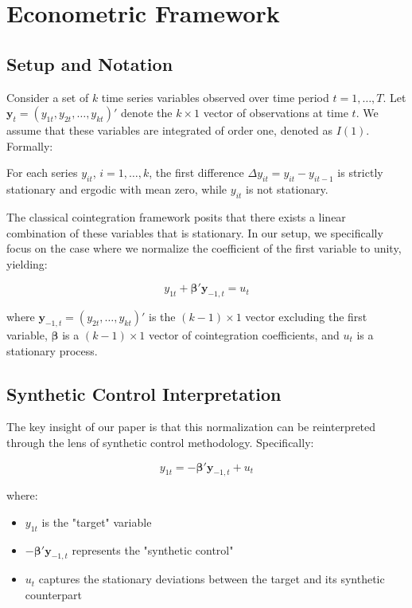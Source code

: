 \section{Econometric Framework}

\subsection{Setup and Notation}

Consider a set of $k$ time series variables observed over time period $t = 1,\ldots,T$. Let $\mathbf{y}_t = (y_{1t}, y_{2t},\ldots,y_{kt})'$ denote the $k \times 1$ vector of observations at time $t$. We assume that these variables are integrated of order one, denoted as $I(1)$. Formally:

\begin{assumption}
For each series $y_{it}$, $i=1,\ldots,k$, the first difference $\Delta y_{it} = y_{it} - y_{it-1}$ is strictly stationary and ergodic with mean zero, while $y_{it}$ is not stationary.
\end{assumption}

The classical cointegration framework posits that there exists a linear combination of these variables that is stationary. In our setup, we specifically focus on the case where we normalize the coefficient of the first variable to unity, yielding:

\begin{equation}
y_{1t} + \boldsymbol{\beta}'\mathbf{y}_{-1,t} = u_t
\end{equation}

where $\mathbf{y}_{-1,t} = (y_{2t},\ldots,y_{kt})'$ is the $(k-1) \times 1$ vector excluding the first variable, $\boldsymbol{\beta}$ is a $(k-1) \times 1$ vector of cointegration coefficients, and $u_t$ is a stationary process.

\subsection{Synthetic Control Interpretation}

The key insight of our paper is that this normalization can be reinterpreted through the lens of synthetic control methodology. Specifically:

\begin{equation}
y_{1t} = -\boldsymbol{\beta}'\mathbf{y}_{-1,t} + u_t
\end{equation}

where:
\begin{itemize}
\item $y_{1t}$ is the "target" variable
\item $-\boldsymbol{\beta}'\mathbf{y}_{-1,t}$ represents the "synthetic control"
\item $u_t$ captures the stationary deviations between the target and its synthetic counterpart
\end{itemize}

